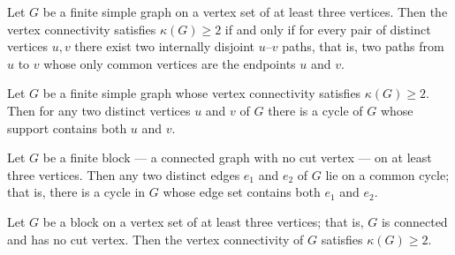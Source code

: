\begin{theorem}
\label{SimpleGraph.two_connected_iff_two_internally_disjoint_paths}
Let $G$ be a finite simple graph on a vertex set of at least three vertices. Then the
vertex connectivity satisfies $\kappa(G) \ge 2$ if and only if for every pair of
distinct vertices $u, v$ there exist two internally disjoint $u$--$v$ paths, that is,
two paths from $u$ to $v$ whose only common vertices are the endpoints $u$ and $v$.
\end{theorem}

\begin{theorem}
\label{SimpleGraph.two_connected_vertices_on_common_cycle}
Let $G$ be a finite simple graph whose vertex connectivity satisfies $\kappa(G) \ge 2$.
Then for any two distinct vertices $u$ and $v$ of $G$ there is a cycle of $G$ whose
support contains both $u$ and $v$.
\end{theorem}

\begin{theorem}
\label{SimpleGraph.block_edges_on_common_cycle}
Let $G$ be a finite block — a connected graph with no cut vertex — on at least three
vertices. Then any two distinct edges $e_1$ and $e_2$ of $G$ lie on a common cycle; that
is, there is a cycle in $G$ whose edge set contains both $e_1$ and $e_2$.
\end{theorem}

\begin{theorem}
\label{SimpleGraph.block_three_vertices_two_connected}
\leanok
{}
Let $G$ be a block on a vertex set of at least three vertices; that is, $G$ is connected
and has no cut vertex. Then the vertex connectivity of $G$ satisfies $\kappa(G) \ge 2$.
\end{theorem}

